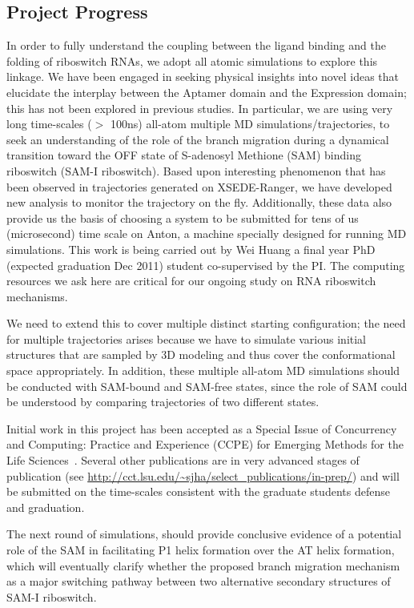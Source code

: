 \documentclass[a4paper,11pt]{article}
\begin{document}
\subsection{Project Progress}
In order to fully understand the coupling between the ligand binding and the folding of riboswitch RNAs, we adopt all atomic simulations to explore this linkage.  We have been engaged in seeking physical insights into novel ideas that elucidate the interplay between the Aptamer domain and the Expression domain; this has not been explored in previous studies.  In particular, we are using very long time-scales ($>$ 100ns) all-atom multiple MD simulations/trajectories, to seek an understanding of the role of the branch migration during a dynamical transition toward the OFF state of S-adenosyl Methione (SAM) binding riboswitch (SAM-I riboswitch).  Based upon interesting phenomenon that has been observed in trajectories generated on XSEDE-Ranger, we have developed new analysis to monitor the trajectory on the fly. Additionally, these data also provide us the basis of choosing a system to be submitted for tens of us (microsecond) time scale on Anton, a machine specially designed for running MD simulations. This work is being carried out by Wei Huang a final year PhD (expected graduation Dec 2011) student co-supervised by the PI.  The computing resources we ask here are critical for our ongoing study on RNA riboswitch mechanisms.

We need to extend this to cover multiple distinct starting configuration; the need for multiple trajectories arises because we have to simulate various initial structures that are sampled by 3D modeling and thus cover the conformational space appropriately.  In addition, these multiple all-atom MD simulations should be conducted with SAM-bound and SAM-free states, since the role of SAM could be understood by comparing trajectories of two different states.

Initial work in this project has been accepted as a Special Issue of
Concurrency and Computing: Practice and Experience (CCPE) for Emerging
Methods for the Life Sciences~\cite{ecmls_ccpe10}.  Several other
publications are in very advanced stages of publication (see
\url{http://cct.lsu.edu/~sjha/select_publications/in-prep/}) and will
be submitted on the time-scales consistent with the graduate students
defense and graduation.

The next round of simulations, should provide conclusive evidence of a potential role of the SAM in facilitating P1 helix formation over the AT helix formation, which will eventually clarify whether the proposed branch migration mechanism as a major switching pathway between two alternative secondary structures of SAM-I riboswitch.
\end{document}

